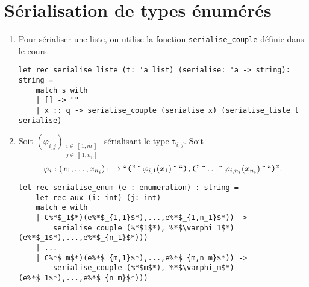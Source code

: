 \section{Sérialisation de types énumérés}

\begin{enumerate}
	\item Pour sérialiser une liste, on utilise la fonction \texttt{serialise\_couple} définie dans le cours.
		\begin{lstlisting}[language=caml,caption=Sérialisation de listes]
let rec serialise_liste (t: 'a list) (serialise: 'a -> string): string =
	match s with
	| [] -> ""
	| x :: q -> serialise_couple (serialise x) (serialise_liste t serialise)
		\end{lstlisting}
	\item Soit $(\varphi_{i,j})_{\substack{i \in \left\llbracket 1,m \right\rrbracket\\ j \in \left\llbracket 1,n_i \right\rrbracket}}$ sérialisant le type $\texttt{t}_{i,j}$. Soit \[
		\varphi_i: (x_1, \ldots, x_{n_i}) \longmapsto \text{``}\texttt{(}\text{''} \mathop{\texttt{\^{}}} \varphi_{i,1}(x_1) \mathop{\texttt{\^{}}} \text{``}\texttt{),(}\text{''} \mathop{\texttt{\^{}}} \ldots \mathop{\texttt{\^{}}} \varphi_{i,n_i}(x_{n_i}) \mathop{\texttt{\^{}}} \text{``}\texttt{)}\text{''}
	.\]
		\begin{lstlisting}[language=caml,caption=Serialisation de types énumérés]
let rec serialise_enum (e : enumeration) : string =
	let rec aux (i: int) (j: int) 
	match e with
	| C%*$_1$*)(e%*$_{1,1}$*),...,e%*$_{1,n_1}$*)) ->
		serialise_couple (%*$1$*), %*$\varphi_1$*)(e%*$_1$*),...,e%*$_{n_1}$*)))
	| ...
	| C%*$_m$*)(e%*$_{m,1}$*),...,e%*$_{m,n_m}$*)) ->
		serialise_couple (%*$m$*), %*$\varphi_m$*)(e%*$_1$*),...,e%*$_{n_m}$*)))
		\end{lstlisting}
\end{enumerate}


